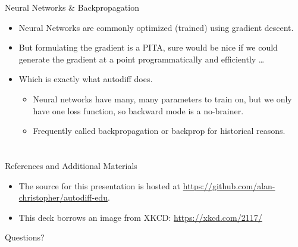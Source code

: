 \documentclass[pdf]{beamer}
\makeatletter
\def\beamer@writeslidentry@miniframesoff{%
  \expandafter\beamer@ifempty\expandafter{\beamer@framestartpage}{}%
  {%
    \clearpage\beamer@notesactions%
  }
}
\newcommand*{\miniframesoff}{\let\beamer@writeslidentry=\beamer@writeslidentry@miniframesoff}
\makeatother
\begin{document}
\begin{frame}{Neural Networks \& Backpropagation}
  \begin{itemize}
  \item Neural Networks are commonly optimized (trained) using gradient descent.
    \pause
  \item But formulating the gradient is a PITA, sure would be nice if we could
    generate the gradient at a point programmatically and efficiently \ldots
    \pause
  \item Which is exactly what autodiff does.
    \begin{itemize}
    \item Neural networks have many, many parameters to train on, but we only
      have one loss function, so backward mode is a no-brainer.
    \item Frequently called backpropagation or backprop for historical reasons.
    \end{itemize}
  \end{itemize}
\end{frame}

\miniframesoff
\section*{}
\begin{frame}{References and Additional Materials}
  \begin{itemize}
  \item The source for this presentation is hosted at
    \url{https://github.com/alan-christopher/autodiff-edu}.

  \item This deck borrows an image from XKCD: \url{https://xkcd.com/2117/}
  \end{itemize}
\end{frame}

\begin{frame}{Questions?}
\end{frame}
\end{document}
